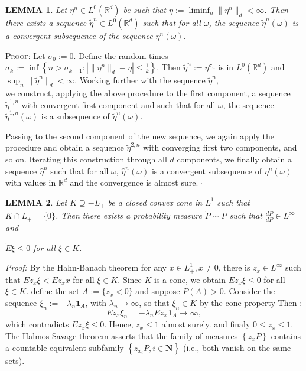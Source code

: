 \documentclass[review]{elsarticle}
\newtheorem{Lemma}{LEMMA}
\begin{document}
\begin{Lemma}\label{lem:important}
   Let $\eta^n \in L^0(\mathbb{R}^d)$ be such that $\eta := \liminf_n \|\eta^n\|_d < \infty$. Then there exists a sequence $\tilde{\eta}^n \in L^0(\mathbb{R}^d)$ such that for all $\omega$, the sequence $\tilde{\eta}^n(\omega)$ is a convergent subsequence of the sequence $\eta^n(\omega)$. 
\end{Lemma} 

\textsc{Proof:} Let $\sigma_0 := 0$. Define the random times
$
\sigma_k := \inf\left\{n > \sigma_{k-1} : \left| \|\eta^n\|_d - \eta \right| \leq \frac{1}{k} \right\}.
$
Then $\tilde{\eta}^n := \eta^{\sigma_n}$ is in $L^0(\mathbb{R}^d)$ and $\sup_n \|\tilde{\eta}^n\|_d < \infty$. Working further with the sequence $\tilde{\eta}^n$,\\ we construct, applying the above procedure to the first component, a sequence $\tilde{\eta}^{1,n}$ with convergent first component and such that for all $\omega$, the sequence $\tilde{\eta}^{1,n}(\omega)$ is a subsequence of $\tilde{\eta}^n(\omega)$.

Passing to the second component of the new sequence, we again apply the procedure and obtain a sequence $\tilde{\eta}^{2,n}$ with converging first two components, and so on. Iterating this construction through all $d$ components, we finally obtain a sequence $\hat{\eta}^n$ such that for all $\omega$, $\hat{\eta}^n(\omega)$ is a convergent subsequence of $\eta^n(\omega)$ with values in $\mathbb{R}^d$ and the convergence is almost sure. \hfill $\square$



\hspace{1cm}\begin{Lemma}
Let $K \supseteq -L_+$ be a closed convex cone in $L^1$ such that $K \cap L_+ = \{0\}$. Then there exists a probability measure $\widetilde{P} \sim P$ such that $\frac{d\widetilde{P}}{dP} \in L^\infty$ and

$\tilde{E} \xi \leq 0$ for all $\xi \in K$.
\end{Lemma}












\textit{Proof:}
By the Hahn-Banach theorem for any $x \in L_{+}^1, x \neq 0$, there is $z_x \in L^{\infty}$ such that $E z_x \xi<E z_x x$ for all $\xi \in K$. Since $K$ is a cone, we obtain $Ez_x \xi \leq 0$ for all $\xi \in K$. 
define the set $A := \{z_x < 0\}$ and suppose $P(A) > 0$. Consider the sequence $\xi_n := -\lambda_n \mathbf{1}_A$, with $\lambda_n \to \infty$, so that $\xi_n \in K$ by the cone property Then :
$$
Ez_x \xi_n = -\lambda_n Ez_x \mathbf{1}_A \to \infty,
$$
which contradicts $Ez_x \xi \leq 0$. Hence, $z_x \leq 1$ almost surely. and finaly $0 \leq z_x \leq 1$.
The Halmos-Savage theorem asserts that the family of measures $\left\{z_x P\right\}$ contains a countable equivalent subfamily $\left\{z_{x_i} P, i \in \mathbf{N}\right\}$ (i.e., both vanish on the same sets).
\end{document}
